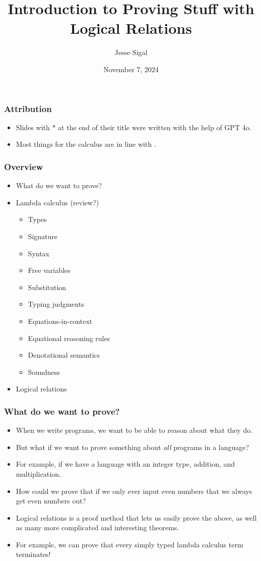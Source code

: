 \documentclass[aspectratio=169]{beamer}
\title{Introduction to Proving Stuff\textsuperscript{\texttrademark} with Logical Relations}
\author{Jesse Sigal}
\date{November 7, 2024}
\begin{document}
\begin{frame}
\titlepage
\end{frame}

\begin{frame}
\frametitle{Attribution}
\begin{itemize}
\item Slides with $*$ at the end of their title were written with the help of GPT 4o.
\item Most things for the calculus are in line with \cite{Crole_1994}.
\end{itemize}
\end{frame}

\begin{frame}
\frametitle{Overview}
\begin{itemize}
    \item What do we want to prove?
    \item Lambda calculus (review?)
    \begin{itemize}
        \item Types
        \item Signature
        \item Syntax
        \item Free variables
        \item Substitution
        \item Typing judgments
        \item Equations-in-context
        \item Equational reasoning rules
        \item Denotational semantics
        \item Soundness
    \end{itemize}
    \item Logical relations
\end{itemize}
\end{frame}

\begin{frame}
\frametitle{What do we want to prove?}

\begin{itemize}
    \item When we write programs, we want to be able to reason about what they do.
    \pause
    \item But what if we want to prove something about \emph{all} programs in a language?
    \pause
    \item For example, if we have a language with an integer type, addition, and multiplication.
    \pause
    \item How could we prove that if we only ever input even numbers that we always get even numbers out?
    \pause
    \item Logical relations is a proof method that lets us easily prove the above, as well as many more complicated and interesting theorems.
    \pause
    \item For example, we can prove that every simply typed lambda calculus term terminates!
\end{itemize}
\end{frame}
\end{document}
